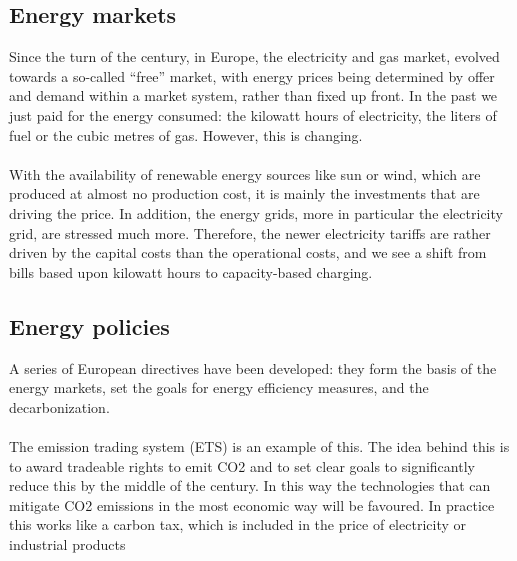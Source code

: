 \documentclass[../summary.tex]{subfiles}
\begin{document}
	\subsection{Energy markets}
	
	 Since the turn of the century, in Europe, the electricity and gas market, evolved towards a so-called “free” market, with energy prices being determined by offer and demand within a market system, rather than fixed up front. In the past we just paid for the energy consumed: the kilowatt hours of electricity, the liters of fuel or the cubic metres of gas. However, this is changing.
	\\\\
	With the availability of renewable energy sources like sun or wind, which are produced at almost no production cost, it is mainly the investments that are driving the price. In addition, the energy grids, more in particular the electricity grid, are stressed much more. Therefore, the newer electricity tariffs are rather driven by the capital costs than the operational costs, and we see a shift from bills based upon kilowatt hours to capacity-based charging. 
	
	\subsection{Energy policies}
	
	A series of European directives have been developed: they form the basis of the energy markets, set the goals for energy efficiency measures, and the decarbonization. 
	\\\\
	The emission trading system (ETS) is an example of this. The idea behind this is to award tradeable rights to emit CO2 and to set clear goals to significantly reduce this by the middle of the century. In this way the technologies that can mitigate CO2 emissions in the most economic way will be favoured. In practice this works like a carbon tax, which is included in the price of electricity or industrial products
	
\end{document}
